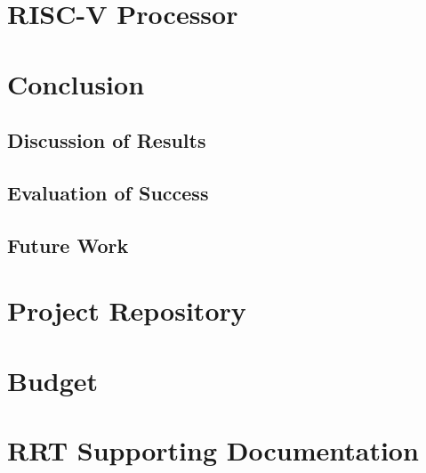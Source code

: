 \documentclass[
    11pt,           %
    letterpaper,    %
    oneside         %
]{report}           %
\begin{document}
\chapter{RISC-V Processor}
    \label{chap:RiscvProcessor}
    

\chapter{Conclusion}
    \section{Discussion of Results}
    \section{Evaluation of Success}
    \section{Future Work}




\begin{appendices}

\chapter{Project Repository}
    \label{appendix:repository}
    

\chapter{Budget}

\chapter{RRT Supporting Documentation}
    \label{appendix:rrt_appendix}
    


\end{appendices} 
\clearpage 
\listoftodos 
\end{document}
